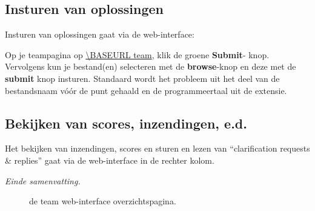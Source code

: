 \subsection*{Insturen van oplossingen}

Insturen van oplossingen gaat via%
de web-interface:
\begin{description}[\breaklabel\setlabelstyle{\bfseries}]
\item[Web-Interface]
Op je teampagina op \url{\BASEURL team}, klik de groene \textbf{Submit}-
knop. Vervolgens kun je bestand(en) selecteren met de \textbf{browse}-knop
en deze met de \textbf{submit} knop insturen.
Standaard wordt het probleem uit het deel van de bestandsnaam v\'o\'or
de punt gehaald en de programmeertaal uit de extensie.

\end{description}

\subsection*{Bekijken van scores, inzendingen, e.d.}

Het bekijken van inzendingen, scores en sturen en lezen van
``clarification requests \& replies'' gaat via de web-interface in de rechter kolom.

\emph{Einde samenvatting.}

\begin{figure}[p]
  \centering
  \caption{de team web-interface overzichtspagina.}
  \label{fig:team-overview}
\end{figure}

